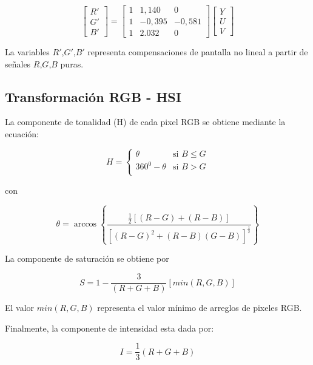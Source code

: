 \begin{equation}
\begin{bmatrix}
R' \\ 
G' \\ 
B'
\end{bmatrix} =
\begin{bmatrix}
1 & 1,140 & 0\\ 
1 & -0,395 & -0,581 \\ 
1 & 2.032 & 0
\end{bmatrix}
\begin{bmatrix}
Y \\ 
U \\ 
V
\end{bmatrix}
\end{equation}

La variables $R'$,$G'$,$B'$ representa compensaciones de pantalla no lineal a partir de señales $R$,$G$,$B$ puras\cite{Jack2008}.


\subsection{Transformación RGB - HSI}

La componente de tonalidad (H) de cada pixel RGB se obtiene mediante la ecuación:

\begin{equation}
H=\left\{
  \begin{array}{ll}
     \theta & \text{si } B \leq G \\
     360^{0} - \theta & \text{si } B > G \\
  \end{array}
  \right.
\end{equation}

con 

\begin{equation}
\theta = \arccos\left\lbrace\frac{\frac{1}{2}[(R-G)+(R-B)]}{[(R-G)^{2}+(R-B)(G-B)]^{\frac{1}{2}}}\right\rbrace
\end{equation}

La componente de saturación se obtiene por 

\begin{equation}
S=1-\frac{3}{(R+G+B)}[min(R,G,B)]
\end{equation}

El valor $min(R,G,B)$ representa el valor mínimo de arreglos de pixeles RGB.

Finalmente, la componente de intensidad esta dada por:

\begin{equation}
I=\frac{1}{3}(R+G+B)
\end{equation}

